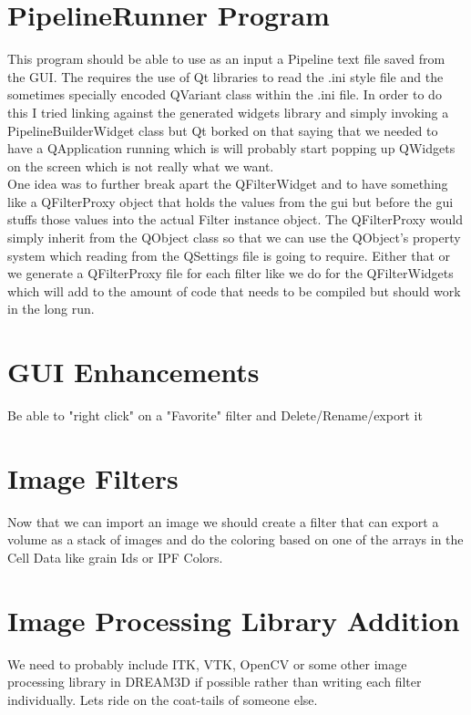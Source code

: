 \documentclass[12pt]{article} %
\begin{document}
\section{PipelineRunner Program}
  This program should be able to use as an input a Pipeline text file saved from the GUI. The requires the use of Qt libraries to read the .ini style file and the sometimes specially encoded QVariant class within the .ini file. In order to do this I tried linking against the generated widgets library and simply invoking a PipelineBuilderWidget class but Qt borked on that saying that we needed to have a QApplication running which is will probably start popping up QWidgets on the screen which is not really what we want.\\
  
  
 One idea was to further break apart the QFilterWidget and to have something like a QFilterProxy object that holds the values from the gui but before the gui stuffs those values into the actual Filter instance object. The QFilterProxy would simply inherit from the QObject class so that we can use the QObject's property system which reading from the QSettings file is going to require. Either that or we generate a QFilterProxy file for each filter like we do for the QFilterWidgets which will add to the amount of code that needs to be compiled but should work in the long run.

\section{GUI Enhancements}
   Be able to "right click" on a "Favorite" filter and Delete/Rename/export it


\section{Image Filters}
   Now that we can import an image we should create a filter that can export a volume as a stack of images and do the coloring based on one of the arrays in the Cell Data like grain Ids or IPF Colors.

\section{Image Processing Library Addition}
   We need to probably include ITK, VTK, OpenCV or some other image processing library in DREAM3D if possible rather than writing each filter individually. Lets ride on the coat-tails of someone else.
\end{document}

